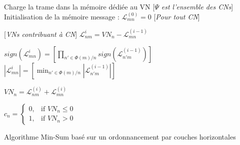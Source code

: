 \documentclass[../main.tex]{subfiles}
\begin{document}
\begin{algorithm}
{
	\small
	\begin{algorithmic}[1]
		\State Charge la trame dans la mémoire dédiée au VN
		[\textit{$\Psi$ est l'ensemble des CNs}] %
		\State Initialisation de la mémoire message : $\mathcal{L}^{(0)}_{mn}=0$
		\EndFor
		[\textit{Pour tout CN}] %
			
		[\textit{VNs contribuant à CN}] %
		\State $ \mathcal{L}^i_{nm} = \textit{VN}_n - \mathcal{L}^{(i-1)}_{mn} $
		\EndFor

		\State $sign(\mathcal{L}^i_{mn}) = \left[ \displaystyle\prod_{n'\in \Phi(m)/n} sign(\mathcal{L}^{(i-1)}_{n'm}) \right]$
		\State $|\mathcal{L}^i_{mn}| = \left[ \displaystyle\min_{n'\in \Phi(m)/n} |\mathcal{L}^{(i-1)}_{n'm}| \right]$
		\EndFor
			
		\State $ \textit{VN}_n = \mathcal{L}^{(i)}_{nm} + \mathcal{L}^{(i)}_{mn} $
		\EndFor
			
		\EndFor
		\EndFor
			
		\State $ c_n = \begin{cases}
                   0,& \text{if } \textit{VN}_n \leq 0\\
                   1,& \text{if } \textit{VN}_n > 0
               \end{cases} $
       \EndFor            
	\end{algorithmic}
	}
	\caption{\small Algorithme Min-Sum basé sur un ordonnancement par couches horizontales}
	\label{ldpc_minsum}
\end{algorithm}
\end{document}
